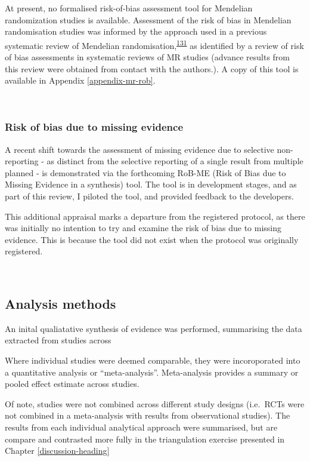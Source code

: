 \documentclass[a4paper, twoside]{templates/ociamthesis}
\begin{document}
At present, no formalised risk-of-bias assessment tool for Mendelian randomization studies is available. Assessment of the risk of bias in Mendelian randomisation studies was informed by the approach used in a previous systematic review of Mendelian randomisation,\textsuperscript{\protect\hyperlink{ref-mamluk2020}{131}} as identified by a review of risk of bias assessments in systematic reviews of MR studies (advance results from this review were obtained from contact with the authors.). A copy of this tool is available in Appendix \ref{appendix-mr-rob}.

~

\hypertarget{risk-of-bias-due-to-missing-evidence}{%
\subsubsection{Risk of bias due to missing evidence}\label{risk-of-bias-due-to-missing-evidence}}

A recent shift towards the assessment of missing evidence due to selective non-reporting - as distinct from the selective reporting of a single result from multiple planned - is demonstrated via the forthcoming RoB-ME (Risk of Bias due to Missing Evidence in a synthesis) tool. The tool is in development stages, and as part of this review, I piloted the tool, and provided feedback to the developers.

This additional appraisal marks a departure from the registered protocol, as there was initially no intention to try and examine the risk of bias due to missing evidence. This is because the tool did not exist when the protocol was originally registered.

~

\hypertarget{analysis-methods}{%
\subsection{Analysis methods}\label{analysis-methods}}

An inital qualiatative synthesis of evidence was performed, summarising the data extracted from studies across

Where individual studies were deemed comparable, they were incoroporated into a quantitative analysis or ``meta-analysis''. Meta-analysis provides a summary or pooled effect estimate across studies.

Of note, studies were not combined across different study designs (i.e.~RCTs were not combined in a meta-analysis with results from observational studies). The results from each individual analytical approach were summarised, but are compare and contrasted more fully in the triangulation exercise presented in Chapter \ref{discussion-heading}
\end{document}
